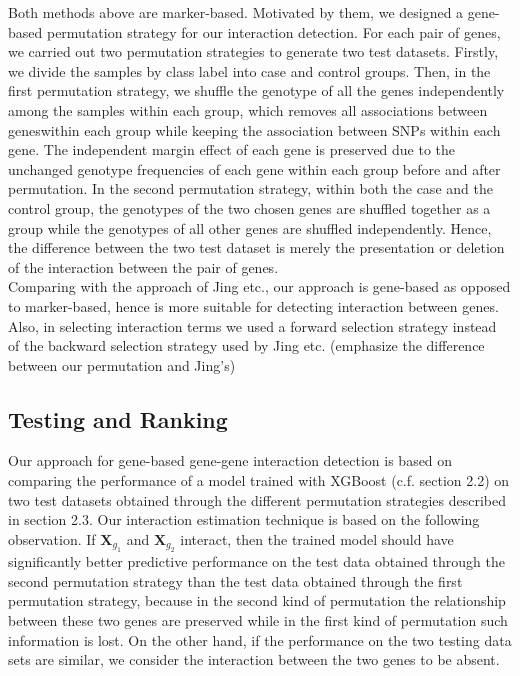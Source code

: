 \documentclass[11pt]{article}
\theoremstyle{plain}
\theoremstyle{definition}
\theoremstyle{remark}
\begin{document}
Both methods above are marker-based. Motivated by them, we designed a gene-based permutation
strategy for our interaction detection. For each pair of genes, we carried out two permutation
strategies to generate two test datasets. Firstly, we divide the samples by class label into case and
control groups. Then, in the first permutation strategy, we shuffle the genotype of all the genes
independently among the samples within each group, which removes all associations between geneswithin each group while keeping the association between SNPs within each gene. The independent
margin effect of each gene is preserved due to the unchanged genotype frequencies of each gene
within each group before and after permutation. In the second permutation strategy, within both the
case and the control group, the genotypes of the two chosen genes are shuffled together as a group
while the genotypes of all other genes are shuffled independently. Hence, the difference between
the two test dataset is merely the presentation or deletion of the interaction between the pair of genes.\\

Comparing with the approach of Jing etc., our approach is gene-based as opposed to marker-based,
hence is more suitable for detecting interaction between genes. Also, in selecting interaction terms
we used a forward selection strategy instead of the backward selection strategy used by Jing etc.
(emphasize the difference between our permutation and Jing’s)

\subsection{Testing and Ranking}

Our approach for gene-based gene-gene interaction detection is based on comparing the
performance of a model trained with XGBoost (c.f. section 2.2) on two test datasets obtained
through the different permutation strategies described in section 2.3. Our interaction estimation
technique is based on the following observation. If $\mathbf{X}_{g_1}$ and $\mathbf{X}_{g_2}$ interact, then the trained model
should have significantly better predictive performance on the test data obtained through the second
permutation strategy than the test data obtained through the first permutation strategy, because in
the second kind of permutation the relationship between these two genes are preserved while in the
first kind of permutation such information is lost. On the other hand, if the performance on the two
testing data sets are similar, we consider the interaction between the two genes to be absent.\\
\end{document}

